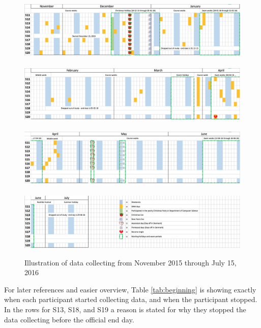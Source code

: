 \documentclass[12pt]{article} %
\begin{document}
\begin{figure}[H]
    \centering
        \includegraphics[width=\textwidth]{img/allAround1}
~
        \includegraphics[width=\textwidth]{img/allAround2}
~
 		\includegraphics[width=\textwidth]{img/allAround3}
~
 		\includegraphics[width=\textwidth]{img/allAround4}       
       
        \caption{Illustration of data collecting from November 2015 through July 15, 2016}
        \label{fig:allAround}
\end{figure}

For later references and easier overview, Table \ref{tab:beginning} is showing exactly when each participant started collecting data, and when the participant stopped. In the rows for S13, S18, and S19 a reason is stated for why they stopped the data collecting before the official end day. 
\end{document}
